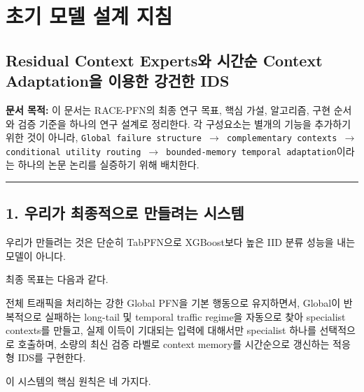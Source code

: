 





\section{초기 모델 설계 지침}

\subsection{Residual Context Experts와 시간순 Context Adaptation을 이용한 강건한 IDS}
\textbf{문서 목적:} 이 문서는 RACE-PFN의 최종 연구 목표, 핵심 가설, 알고리즘, 구현 순서와 검증 기준을 하나의 연구 설계로 정리한다. 각 구성요소는 별개의 기능을 추가하기 위한 것이 아니라, \texttt{Global f\allowbreak{}ailure s\allowbreak{}tructure\allowbreak{}   \ensuremath{\rightarrow}   com\allowbreak{}plementa\allowbreak{}ry conte\allowbreak{}xts   \ensuremath{\rightarrow}   \allowbreak{}conditio\allowbreak{}nal util\allowbreak{}ity rout\allowbreak{}ing   \ensuremath{\rightarrow}   \allowbreak{}bounded-\allowbreak{}memory t\allowbreak{}emporal \allowbreak{}adaptati\allowbreak{}on}이라는 하나의 논문 논리를 실증하기 위해 배치한다.


\medskip\hrule\medskip
\subsection{1. 우리가 최종적으로 만들려는 시스템}
우리가 만들려는 것은 단순히 TabPFN으로 XGBoost보다 높은 IID 분류 성능을 내는 모델이 아니다.

최종 목표는 다음과 같다.

전체 트래픽을 처리하는 강한 Global PFN을 기본 행동으로 유지하면서, Global이 반복적으로 실패하는 long-tail 및 temporal traffic regime을 자동으로 찾아 specialist contexts를 만들고, 실제 이득이 기대되는 입력에 대해서만 specialist 하나를 선택적으로 호출하며, 소량의 최신 검증 라벨로 context memory를 시간순으로 갱신하는 적응형 IDS를 구현한다.



이 시스템의 핵심 원칙은 네 가지다. 

